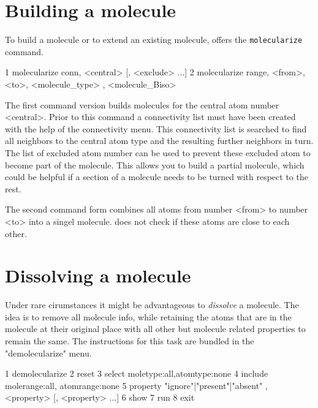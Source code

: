 
\section{Building   a molecule \label{mod-molec}}

To build a molecule or to extend an existing molecule, \Discus
offers the {\tt molecularize} command. 
\begin{MacVerbatim}
 1 molecularize conn, <central> [, <exclude> ...]
 2 molecularize range, <from>, <to>, <molecule_type> , <molecule_Biso>
\end{MacVerbatim}

The first command version builds molecules for the central atom
number  <central>. Prior to this command a connectivity list must have been
created with the help of the connectivity menu. This connectivity list is
searched to find all neighbors to the central atom type and the resulting
further neighbors in turn. The list of excluded atom number can be used 
to prevent these excluded atom to become part of the molecule. 
This allows you to build a partial molecule, which could be helpful
if a section of a molecule needs to be turned with respect to the rest.

The second command form combines all atoms from number <from> to number <to>
into a singel molecule. \discus does not check if these atoms are close to 
each other.


\section{Dissolving a molecule \label{mod-demole}}

Under rare cirumstances it might be advantageous to {\it dissolve} a molecule.
The idea is to remove all molecule info, while retaining the atoms that are in
the molecule at their original place with all other but molecule related 
properties to remain the same. The instructions for this task are bundled in
the "demolecularize" menu.

\begin{MacVerbatim}
 1 demolecularize
 2   reset
 3   select moletype:all,atomtype:none
 4   include molerange:all, atomrange:none
 5   property {"ignore"|"present"|"absent"} , <property> [, <property> ...]
 6   show
 7   run
 8 exit
\end{MacVerbatim}

